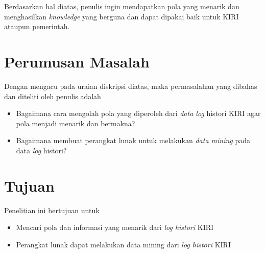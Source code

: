 Berdasarkan hal diatas, penulis ingin mendapatkan pola yang menarik dan menghasilkan \textsl{knowledge} yang berguna dan dapat dipakai baik untuk KIRI ataupun pemerintah.





\section{Perumusan Masalah}
Dengan mengacu pada uraian diskripsi diatas, maka permasalahan yang dibahas dan diteliti oleh penulis adalah
\begin{itemize}
	\item Bagaimana cara mengolah pola yang diperoleh dari \textsl{data log} histori  KIRI agar pola menjadi menarik dan bermakna?
	\item Bagaimana membuat perangkat lunak untuk melakukan \textsl{data mining} pada data \textsl{log} histori?
\end{itemize}

\section{Tujuan}
Penelitian ini bertujuan untuk 
\begin{itemize}
	\item Mencari pola dan informasi yang menarik dari \textsl{log histori} KIRI
	\item Perangkat lunak dapat melakukan data mining dari \textsl{log histori} KIRI
\end{itemize}


